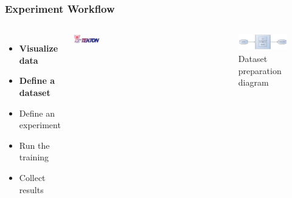\documentclass[aspectratio=169,11pt,hyperref={colorlinks=true}]{beamer}
\begin{document}
\begin{frame}
    \frametitle{Experiment Workflow}
    \begin{columns}
        \begin{itemize}
            \item{\textbf{Visualize data}}
            \item{\textbf{Define a dataset}}
            \item{Define an experiment}
            \item{Run the training}
            \item{Collect results}
        \end{itemize}
        \vspace{0.1\paperheight}
        \begin{center}
          \includegraphics[width=0.4\textwidth]{img/tekton.png}
        \end{center}
          \begin{figure}
            
          \end{figure}
          \begin{figure}
            \includegraphics[width=1\textwidth]{diagrams/build-dataset.png}
            \caption{Dataset preparation diagram}
          \end{figure}
    \end{columns}
\end{frame}
\end{document}
